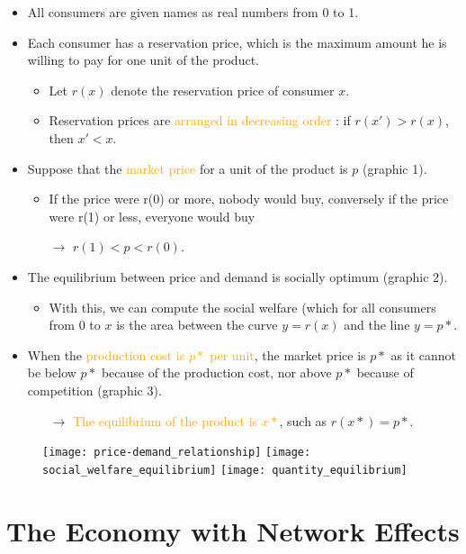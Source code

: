 \begin{itemize}
\item All consumers are given names as real numbers from 0 to 1.
\item Each consumer has a reservation price, which is the maximum amount he is willing to pay for one unit of the product.
	\begin{itemize}
	\item Let $r(x)$ denote the reservation price of consumer $x$.
	\item Reservation prices are \textcolor{orange}{arranged in decreasing order} : if $r(x') > r(x)$, then $x' < x$.
	\end{itemize}
\item Suppose that the \textcolor{orange}{market price} for a unit of the product is $p$ (graphic 1).
	\begin{itemize}
	\item If the price were r(0) or more, nobody would buy, conversely if the price were r(1) or less, everyone would buy
	\item[$\rightarrow$] $r(1) < p < r(0)$.
	\end{itemize}
\item The equilibrium between price and demand is socially optimum (graphic 2).
	\begin{itemize}
	\item With this, we can compute the social welfare (which for all consumers from $0$ to $x$ is the area between the curve $y=r(x)$ and the line $y=p*$.
	\end{itemize}
\item When the \textcolor{orange}{production cost is $p*$ per unit}, the market price is $p*$ as it cannot be below $p*$ because of the production cost, nor above $p*$ because of competition (graphic 3).
	\begin{itemize}
	\item[$\rightarrow$] \textcolor{orange}{The equilibrium of the product is $x*$}, such as $r(x*) = p*$.
	\end{itemize}
\end{itemize}

\begin{figure}[htp]
    \centering
    \texttt{[image: price-demand\_relationship]}\hfill
	\texttt{[image: social\_welfare\_equilibrium]}\hfill
	\texttt{[image: quantity\_equilibrium]}
\end{figure}

\section{The Economy with Network Effects}

